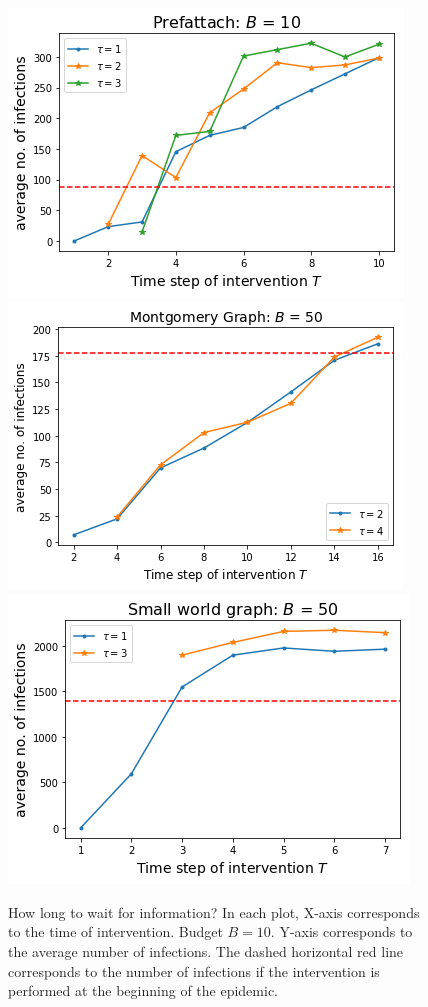 \begin{figure}[!h]

\centering
\includegraphics[width=.37\textwidth]{figures/prefattach_howlong.png}\hfill
\includegraphics[width=.37\textwidth]{figures/montgo_howlong.png}\hfill
\includegraphics[width=.37\textwidth]{figures/sw_howlong.png}

\caption{How long to wait for information? In each plot, X-axis corresponds to the time of intervention. Budget $B = 10$. Y-axis corresponds to the average number of infections. The dashed horizontal red line corresponds to the number of infections if the intervention is performed at the beginning of the epidemic.}
\label{fig:howlong}

\end{figure}



